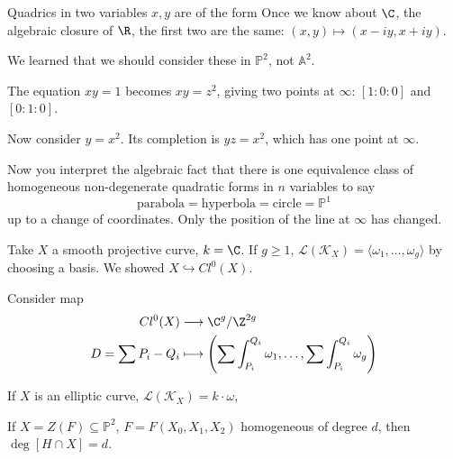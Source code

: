 \documentclass{article}
\newcommand{\A}{\mathbb{A}}
\newcommand{\proj}{\mathbb{P}}
\begin{document}
\begin{remark}
    Quadrics in two variables $x, y$ are of the form
    Once we know about $\C$, the algebraic closure of $\R$, the first two are the same: $(x, y) \mapsto (x-iy, x+iy)$.

    We learned that we should consider these in $\proj^2$, not $\A^2$.

    The equation $xy=1$ becomes $xy=z^2$, giving two points at $\infty$: $[1:0:0]$ and $[0:1:0]$.

    Now consider $y=x^2$. Its completion is $yz=x^2$, which has one point at $\infty$.

    Now you interpret the algebraic fact that there is one equivalence class of homogeneous non-degenerate quadratic forms in $n$ variables to say
    \begin{equation*}
        \text{parabola} = \text{hyperbola} = \text{circle} = \proj^1
    \end{equation*}
    up to a change of coordinates.
    Only the position of the line at $\infty$ has changed.
\end{remark}

Take $X$ a smooth projective curve, $k = \C$.
If $g \geq 1$, $\mathcal{L}(\mathcal{K}_X) = \langle\omega_1, \dotsc, \omega_g \rangle$ by choosing a basis. We showed $X \hookrightarrow Cl^0(X)$.

Consider map
\begin{align*}
    Cl^0(X) &\longrightarrow \C^g/\Z^{2g} \\
    D = \sum P_i - Q_i & \longmapsto \left(\sum \int_{P_i}^{Q_i} \omega_1, \dotsc, \sum \int_{P_i}^{Q_i} \omega_g\right)
\end{align*}
\begin{eg}
    If $X$ is an elliptic curve, $\mathcal{L}(\mathcal{K}_X) = k \cdot \omega$, %
\end{eg}

\begin{prop}
    If $X = Z(F) \subseteq \proj^2$, $F = F(X_0, X_1, X_2)$ homogeneous of degree $d$, then $\deg [H \cap X] = d$.
\end{prop}
\end{document}
